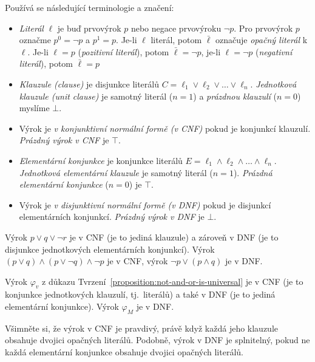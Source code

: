 Používá se následující terminologie a značení:
\begin{itemize}
    \item \emph{Literál} $\ell$ je buď prvovýrok $p$ nebo negace prvovýroku $\neg p$. Pro prvovýrok $p$ označme $p^0=\neg p$ a $p^1=p$. Je-li $\ell$ literál, potom $\bar \ell$ označuje \emph{opačný literál} k $\ell$. Je-li $\ell=p$ (\emph{pozitivní literál}), potom $\bar \ell=\neg p$, je-li $\ell=\neg p$ (\emph{negativní literál}), potom $\bar \ell=p$
    \item \emph{Klauzule (clause)} je disjunkce literálů $C=\ell_1\lor\ell_2\lor\dots\lor\ell_n$. \emph{Jednotková klauzule (unit clause)} je samotný literál ($n=1$) a \emph{prázdnou klauzulí} ($n=0$) myslíme $\bot$.
    \item Výrok je \emph{v konjunktivní normální formě (v CNF)} pokud je konjunkcí klauzulí. \emph{Prázdný výrok v CNF} je $\top$.
    \item \emph{Elementární konjunkce} je konjunkce literálů $E=\ell_1\land\ell_2\land\dots\land\ell_n$. \emph{Jednotková elementární klauzule} je samotný literál ($n=1$). \emph{Prázdná elementární konjunkce} ($n=0$) je $\top$.
    \item Výrok je \emph{v disjunktivní normální formě (v DNF)} pokud je disjunkcí elementárních konjunkcí. \emph{Prázdný výrok v DNF} je $\bot$.
\end{itemize}

\begin{example}
    Výrok ${{p\lor q}\lor\neg r}$ je v CNF (je to jediná klauzule) a zároveň v DNF (je to disjunkce jednotkových elementárních konjunkcí). Výrok $(p\lor q)\land (p\lor \neg q)\land \neg p$ je v CNF, výrok $\neg p\lor (p\land q)$ je v DNF.
\end{example}

\begin{example}
    Výrok $\varphi_v$ z důkazu Tvrzení~\ref{proposition:not-and-or-is-universal} je v CNF (je to konjunkce jednotkových klauzulí, tj.\ literálů) a také v DNF (je to jediná elementární konjunkce). Výrok $\varphi_M$ je v DNF.
\end{example}

\begin{observation}
Všimněte si, že výrok v CNF je pravdivý, právě když každá jeho klauzule obsahuje dvojici opačných literálů. Podobně, výrok v DNF je splnitelný, pokud ne každá elementární konjunkce obsahuje dvojici opačných literálů.
\end{observation}

